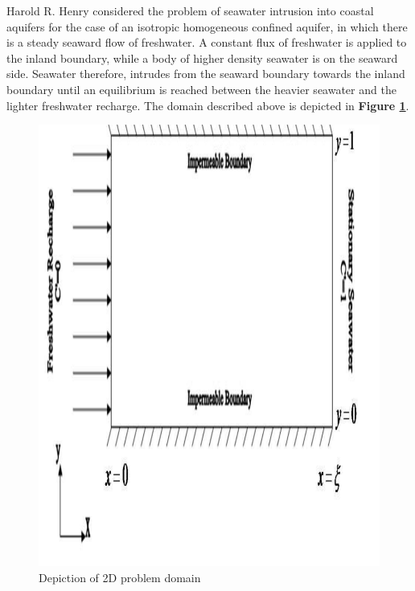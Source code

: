 Harold R. Henry \cite{Henry60} \cite{Henry64} considered the problem of seawater intrusion into
coastal aquifers for the case of an isotropic homogeneous confined aquifer, in which there is a
steady seaward flow of freshwater. A constant flux of freshwater is applied to the inland boundary,
while a body of higher density seawater is on the seaward side. Seawater therefore, intrudes from
the seaward boundary towards the inland boundary until an equilibrium is reached between the heavier
seawater and the lighter freshwater recharge. The domain described above is depicted in
\textbf{Figure \ref{fig:Domain}}.

\begin{figure}[htp]
    \centering
    \includegraphics[totalheight=0.45 \textheight,viewport=3mm 4mm 205mm 292mm]
    {image1}
    \caption{Depiction of 2D problem domain} \label{fig:Domain}
\end{figure}

